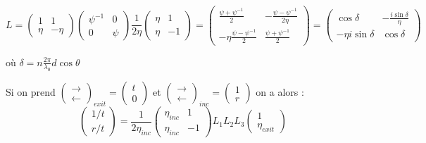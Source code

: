 \documentclass[a4paper,english]{article}
\begin{document}
\begin{dmath}
L = \begin{pmatrix} 1 & 1 \\ \eta & -\eta \end{pmatrix} \begin{pmatrix} \psi^{-1} & 0 \\ 0 & \psi \end{pmatrix} \frac{1}{2 \eta} \begin{pmatrix} \eta & 1 \\ \eta & -1 \end{pmatrix} = 
\begin{pmatrix} \frac{\psi + \psi^{-1}}{2} & -\frac{\psi - \psi^{-1}}{2\eta} \\ -\eta\frac{\psi - \psi^{-1}}{2} & \frac{\psi + \psi^{-1}}{2} \end{pmatrix} =
\begin{pmatrix} \cos \delta & -\frac{i \sin \delta}{\eta} \\ -\eta i \sin \delta & \cos \delta \end{pmatrix}
\end{dmath}

où $\delta = n \frac{2\pi}{\lambda_0} d \cos \theta$

Si on prend $\begin{pmatrix}\rightarrow \\ \leftarrow\end{pmatrix}_{exit} = \begin{pmatrix}t \\ 0\end{pmatrix}$ et $\begin{pmatrix}\rightarrow \\ \leftarrow\end{pmatrix}_{inc} = \begin{pmatrix}1 \\ r\end{pmatrix}$ on a alors :
\begin{dmath}
\begin{pmatrix}1/t \\ r/t \end{pmatrix} = \frac{1}{2 \eta_{inc}} \begin{pmatrix} \eta_{inc} & 1 \\ \eta_{inc} & -1 \end{pmatrix} L_1 L_2 L_3 \begin{pmatrix} 1 \\ \eta_{exit} \end{pmatrix}
\end{dmath}
\end{document}
